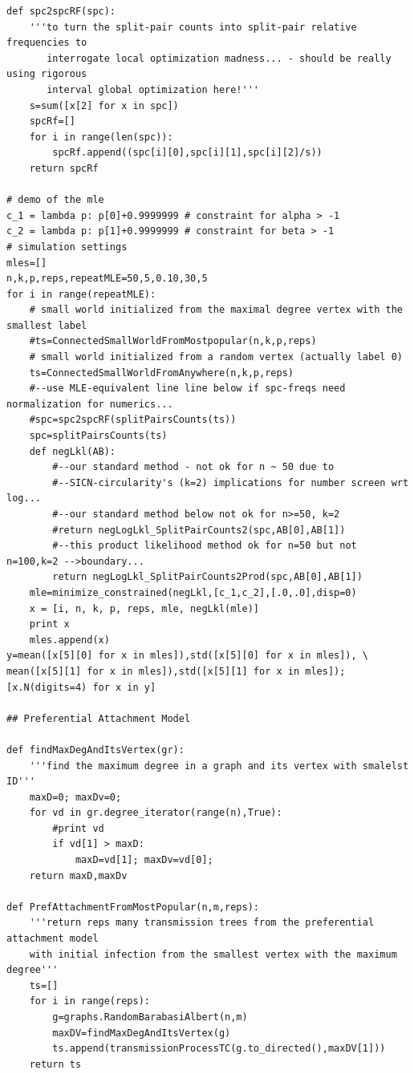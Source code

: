 \documentclass[review]{elsarticle}
\numberwithin{equation}{section}
\begin{document}
{\begin{verbatim}
def spc2spcRF(spc):
    '''to turn the split-pair counts into split-pair relative frequencies to
       interrogate local optimization madness... - should be really using rigorous 
       interval global optimization here!'''
    s=sum([x[2] for x in spc])
    spcRf=[]
    for i in range(len(spc)):
        spcRf.append((spc[i][0],spc[i][1],spc[i][2]/s))
    return spcRf

# demo of the mle 
c_1 = lambda p: p[0]+0.9999999 # constraint for alpha > -1
c_2 = lambda p: p[1]+0.9999999 # constraint for beta > -1
# simulation settings
mles=[]
n,k,p,reps,repeatMLE=50,5,0.10,30,5
for i in range(repeatMLE):
    # small world initialized from the maximal degree vertex with the smallest label
    #ts=ConnectedSmallWorldFromMostpopular(n,k,p,reps)
    # small world initialized from a random vertex (actually label 0)
    ts=ConnectedSmallWorldFromAnywhere(n,k,p,reps)
    #--use MLE-equivalent line line below if spc-freqs need normalization for numerics...
    #spc=spc2spcRF(splitPairsCounts(ts)) 
    spc=splitPairsCounts(ts)
    def negLkl(AB):
        #--our standard method - not ok for n ~ 50 due to 
        #--SICN-circularity's (k=2) implications for number screen wrt log...
        #--our standard method below not ok for n>=50, k=2
        #return negLogLkl_SplitPairCounts2(spc,AB[0],AB[1]) 
        #--this product likelihood method ok for n=50 but not n=100,k=2 -->boundary...
        return negLogLkl_SplitPairCounts2Prod(spc,AB[0],AB[1]) 
    mle=minimize_constrained(negLkl,[c_1,c_2],[.0,.0],disp=0)
    x = [i, n, k, p, reps, mle, negLkl(mle)]
    print x
    mles.append(x)
y=mean([x[5][0] for x in mles]),std([x[5][0] for x in mles]), \
mean([x[5][1] for x in mles]),std([x[5][1] for x in mles]); [x.N(digits=4) for x in y]

## Preferential Attachment Model

def findMaxDegAndItsVertex(gr):
    '''find the maximum degree in a graph and its vertex with smalelst ID'''
    maxD=0; maxDv=0;
    for vd in gr.degree_iterator(range(n),True):
        #print vd
        if vd[1] > maxD:
            maxD=vd[1]; maxDv=vd[0];
    return maxD,maxDv

def PrefAttachmentFromMostPopular(n,m,reps):
    '''return reps many transmission trees from the preferential attachment model 
    with initial infection from the smallest vertex with the maximum degree'''
    ts=[]
    for i in range(reps):
        g=graphs.RandomBarabasiAlbert(n,m)
        maxDV=findMaxDegAndItsVertex(g)
        ts.append(transmissionProcessTC(g.to_directed(),maxDV[1]))
    return ts


\end{verbatim}}
\end{document}
